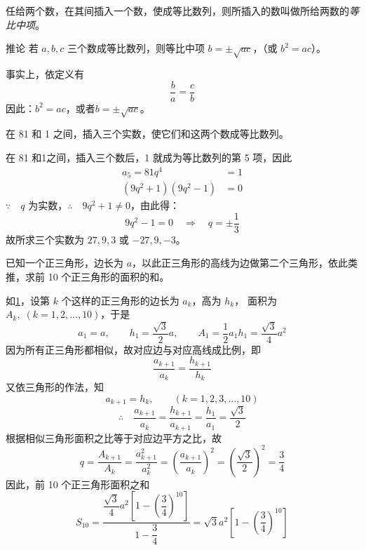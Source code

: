 \begin{Definition}
  任给两个数，在其间插入一个数，使成等比数列，则所插入的数叫做所给两数的\emph{等比中项}。
\end{Definition}

\begin{Deduction}{推论}
  若 $a,b,c$ 三个数成等比数列，则等比中项 $b=\pm\sqrt{ac}$，（或 $b^2=ac$）。    
\end{Deduction}

事实上，依定义有
\[\frac{b}{a}=\frac{c}{b}\]
因此：$b^2=ac$，或者$b=\pm\sqrt{ac}$。

\begin{example}
  在 81 和 1 之间，插入三个实数，使它们和这两个数成等比数列。
\end{example}

\begin{solution}
  在 81 和1之间，插入三个数后，1 就成为等比数列的第 5 项，因此
\[\begin{split}
  a_5=81q^4&=1\\
  (9q^2+1)(9q^2-1)&=0  
\end{split}\]
$\because\quad q$ 为实数，$\therefore\quad 9q^2+1\ne 0$，由此得：
\[9q^2-1=0\quad \Rightarrow\quad q=\pm\frac{1}{3}\]
故所求三个实数为 $27,9,3$ 或 $-27,9,-3$。
\end{solution}


\begin{example}
  已知一个正三角形，边长为 $a$，以此正三角形的高线为边做第二个三角形，依此类推，求前 10 个正三角形的面积的和。
\end{example}

\begin{figure}
    \caption{}\label{fig:triangle}
\end{figure}


\begin{solution}
  如\cref{fig:triangle}，设第 $k$ 个这样的正三角形的边长为 $a_k$，高为 $h_k$， 面积为 $A_k,\; (k=1,2,\ldots,10)$，于是
\[a_1=a,\qquad h_1=\frac{\sqrt{3}}{2}a,\qquad A_1=\frac{1}{2}a_1h_1=\frac{\sqrt{3}}{4}a^2\]
因为所有正三角形都相似，故对应边与对应高线成比例，即
\[\frac{a_{k+1}}{a_{k}}=\frac{h_{k+1}}{h_k}\]
又依三角形的作法，知
\[a_{k+1}=h_k,\qquad (k=1,2,3,\ldots,10)\]
\[\therefore\quad \frac{a_{k+1}}{a_{k}}=\frac{h_{k+1}}{a_{k+1}}=\frac{h_1}{a_1}=\frac{\sqrt{3}}{2}\]
根据相似三角形面积之比等于对应边平方之比，故
\[q=\frac{A_{k+1}}{A_k}=\frac{a^2_{k+1}}{a^2_k}=\left(\frac{a_{k+1}}{a_k}\right)^2=\left(\frac{\sqrt{3}}{2}\right)^2=\frac{3}{4}\]
因此，前 10 个正三角形面积之和
\[S_{10}=\frac{\dfrac{\sqrt{3}}{4}a^2\left[1-\left(\dfrac{3}{4}\right)^{10}\right]}{1-\dfrac{3}{4}}=\sqrt{3}a^2\left[1-\left(\frac{3}{4}\right)^{10}\right]\]
\end{solution}

